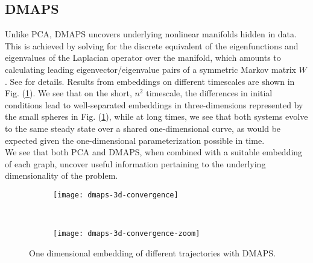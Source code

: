 \documentclass[epjST, final]{svjour}
\begin{document}
\begin{onehalfspace}
\subsection{DMAPS}

Unlike PCA, DMAPS uncovers underlying nonlinear manifolds hidden in data. This is achieved by solving for the discrete equivalent of the eigenfunctions and eigenvalues of the Laplacian operator over the manifold, which amounts to calculating leading eigenvector/eigenvalue pairs of a symmetric Markov matrix $W$. See \cite{coifman_diffusion_2006,nadler_diffusion_2006} for details. Results from embeddings on different timescales are shown in Fig. (\ref{fig:dmaps-results}). We see that on the short, $n^2$ timescale, the differences in initial conditions lead to well-separated embeddings in three-dimensions represented by the small spheres in Fig. (\ref{fig:dmaps-results}), while at long times, we see that both systems evolve to the same steady state over a shared one-dimensional curve, as would be expected given the one-dimensional parameterization possible in time. \\

We see that both PCA and DMAPS, when combined with a suitable embedding of each graph, uncover useful information pertaining to the underlying dimensionality of the problem.


\begin{figure}[h!]
  \vspace{-5mm}
  \centering
  \begin{subfigure}{0.75\textwidth}
    \centering
    \texttt{[image: dmaps-3d-convergence]}
  \end{subfigure} \\ %
  \begin{subfigure}{0.75\textwidth}
    \centering
    \texttt{[image: dmaps-3d-convergence-zoom]}
  \end{subfigure}%
  \caption{One dimensional embedding of different trajectories with DMAPS. \label{fig:dmaps-results}}
\end{figure}


\end{onehalfspace}
\end{document}

